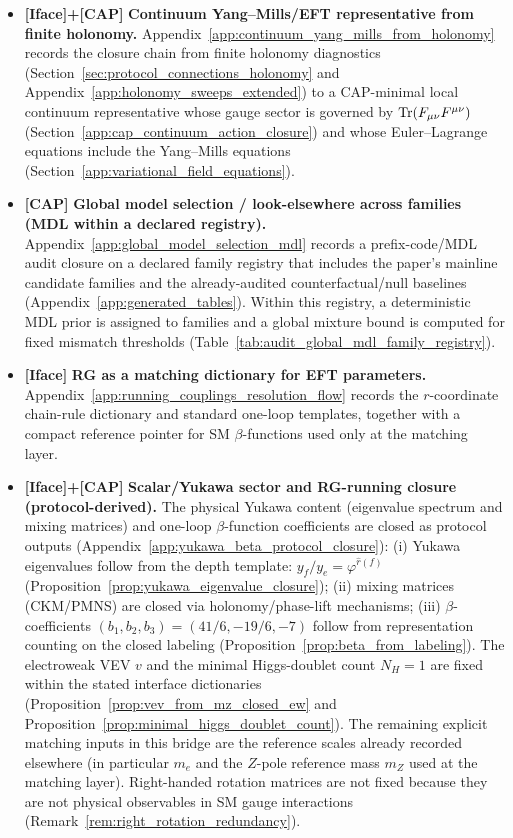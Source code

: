 \begin{itemize}
  \item \textbf{[Iface]+[CAP]} \textbf{Continuum Yang--Mills/EFT representative from finite holonomy.}
  Appendix~\ref{app:continuum_yang_mills_from_holonomy} records the closure chain from finite holonomy diagnostics (Section~\ref{sec:protocol_connections_holonomy} and Appendix~\ref{app:holonomy_sweeps_extended}) to a CAP-minimal local continuum representative whose gauge sector is governed by $\mathrm{Tr}(F_{\mu\nu}F^{\mu\nu})$ (Section~\ref{app:cap_continuum_action_closure}) and whose Euler--Lagrange equations include the Yang--Mills equations (Section~\ref{app:variational_field_equations}).

  \item \textbf{[CAP]} \textbf{Global model selection / look-elsewhere across families (MDL within a declared registry).}
  Appendix~\ref{app:global_model_selection_mdl} records a prefix-code/MDL audit closure on a declared family registry that includes the paper's mainline candidate families and the already-audited counterfactual/null baselines (Appendix~\ref{app:generated_tables}).
  Within this registry, a deterministic MDL prior is assigned to families and a global mixture bound is computed for fixed mismatch thresholds (Table~\ref{tab:audit_global_mdl_family_registry}).

  \item \textbf{[Iface]} \textbf{RG as a matching dictionary for EFT parameters.}
  Appendix~\ref{app:running_couplings_resolution_flow} records the $r$-coordinate chain-rule dictionary and standard one-loop templates, together with a compact reference pointer for SM $\beta$-functions used only at the matching layer.

  \item \textbf{[Iface]+[CAP]} \textbf{Scalar/Yukawa sector and RG-running closure (protocol-derived).}
  The physical Yukawa content (eigenvalue spectrum and mixing matrices) and one-loop $\beta$-function coefficients are closed as protocol outputs (Appendix~\ref{app:yukawa_beta_protocol_closure}):
  (i) Yukawa eigenvalues follow from the depth template: $y_f/y_e=\varphi^{\widehat r(f)}$ (Proposition~\ref{prop:yukawa_eigenvalue_closure});
  (ii) mixing matrices (CKM/PMNS) are closed via holonomy/phase-lift mechanisms;
  (iii) $\beta$-coefficients $(b_1,b_2,b_3)=(41/6,-19/6,-7)$ follow from representation counting on the closed labeling (Proposition~\ref{prop:beta_from_labeling}).
  \AuditTag The electroweak VEV $v$ and the minimal Higgs-doublet count $N_H=1$ are fixed within the stated interface dictionaries (Proposition~\ref{prop:vev_from_mz_closed_ew} and Proposition~\ref{prop:minimal_higgs_doublet_count}).
  The remaining explicit matching inputs in this bridge are the reference scales already recorded elsewhere (in particular $m_e$ and the $Z$-pole reference mass $m_Z$ used at the matching layer).
  Right-handed rotation matrices are not fixed because they are not physical observables in SM gauge interactions (Remark~\ref{rem:right_rotation_redundancy}).
\end{itemize}


